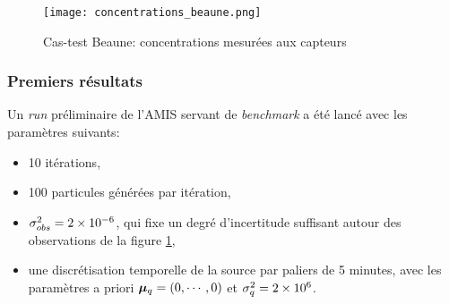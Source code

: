 %




\begin{figure}[h!]
	\centering
	\texttt{[image: concentrations\_beaune.png]}
	\caption{Cas-test Beaune: concentrations mesurées aux capteurs}
	\label{fig_observations_25CAPTEURS}
\end{figure}


\subsubsection{Premiers résultats}

Un \textit{run} préliminaire de l'AMIS servant de \textit{benchmark} a été lancé avec les paramètres suivants:
\begin{itemize}
	\item 10 itérations,
	\item 100 particules générées par itération,
	\item ${\sigma_{obs}^2} = 2\times 10^{-6}$, qui fixe un degré d'incertitude suffisant autour des observations de la figure \ref{fig_observations_25CAPTEURS},
	\item une discrétisation temporelle de la source par paliers de 5 minutes, avec les paramètres a priori ${\bm{\mu}_q} = (0,\cdots,0)$ et $\sigma_q^2 = 2\times 10^6$.
\end{itemize}

